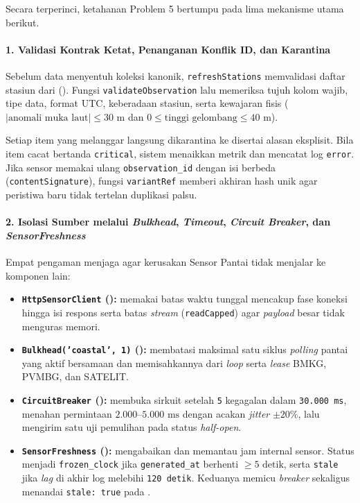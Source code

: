 Secara terperinci, ketahanan Problem 5 bertumpu pada lima mekanisme utama berikut.

\paragraph*{1. Validasi Kontrak Ketat, Penanganan Konflik ID, dan Karantina}
Sebelum data menyentuh koleksi kanonik, \texttt{refreshStations} memvalidasi daftar stasiun dari  (). Fungsi \texttt{validateObservation} lalu memeriksa tujuh kolom wajib, tipe data, format UTC, keberadaan stasiun, serta kewajaran fisis ($|\text{anomali muka laut}| \le 30\text{ m}$ dan $0 \le \text{tinggi gelombang} \le 40\text{ m}$).

Setiap item yang melanggar langsung dikarantina ke  disertai alasan eksplisit. Bila item cacat bertanda \texttt{critical}, sistem menaikkan metrik  dan mencatat log \texttt{error}. Jika sensor memakai ulang \texttt{observation\_id} dengan isi berbeda (\texttt{contentSignature}), fungsi \texttt{variantRef} memberi akhiran hash unik agar peristiwa baru tidak tertelan duplikasi palsu.

\paragraph*{2. Isolasi Sumber melalui \textit{Bulkhead}, \textit{Timeout}, \textit{Circuit Breaker}, dan \textit{SensorFreshness}}
Empat pengaman menjaga agar kerusakan Sensor Pantai tidak menjalar ke komponen lain:

\begin{itemize}
  \item \textbf{\texttt{HttpSensorClient} ():} memakai batas waktu tunggal  mencakup fase koneksi hingga isi respons serta batas \textit{stream}  (\texttt{readCapped}) agar \textit{payload} besar tidak menguras memori.
  \item \textbf{\texttt{Bulkhead('coastal', 1)} ():} membatasi maksimal satu siklus \textit{polling} pantai yang aktif bersamaan dan memisahkannya dari \textit{loop} serta \textit{lease} BMKG, PVMBG, dan SATELIT.
  \item \textbf{\texttt{CircuitBreaker} ():} membuka sirkuit setelah \texttt{5} kegagalan dalam \texttt{30.000 ms}, menahan permintaan $2.000$--$5.000\text{ ms}$ dengan acakan \textit{jitter} $\pm 20\%$, lalu mengirim satu uji pemulihan pada status \textit{half-open}.
  \item \textbf{\texttt{SensorFreshness} ():} mengabaikan  dan memantau jam internal sensor. Status menjadi \texttt{frozen\_clock} jika \texttt{generated\_at} berhenti $\ge 5\text{ detik}$, serta \texttt{stale} jika \textit{lag} di akhir log melebihi \texttt{120 detik}. Keduanya memicu \textit{breaker} sekaligus menandai \texttt{stale: true} pada .
\end{itemize}

